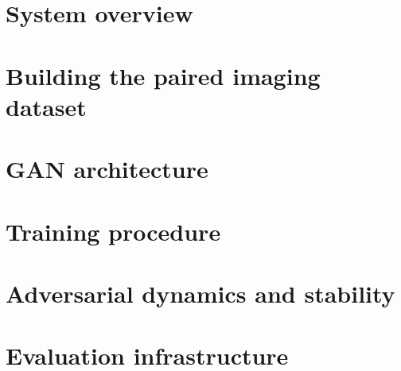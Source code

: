 \section{System overview}

\section{Building the paired imaging dataset}

\section{GAN architecture}

\section{Training procedure}

\section{Adversarial dynamics and stability}

\section{Evaluation infrastructure}
